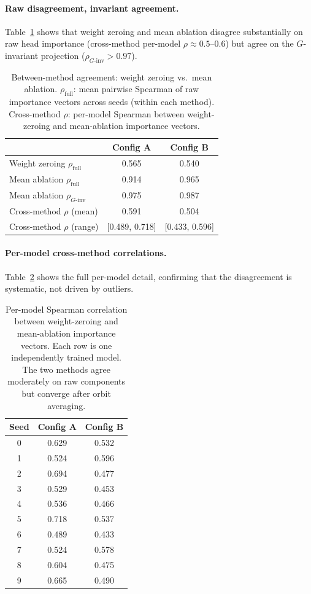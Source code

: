 \documentclass{article}
\begin{document}
\paragraph{Raw disagreement, invariant agreement.}
Table~\ref{tab:mean-ablation-agreement} shows that weight zeroing and mean ablation disagree substantially on raw head importance (cross-method per-model $\rho \approx 0.5$--$0.6$) but agree on the $G$-invariant projection ($\rho_{G\text{-inv}} > 0.97$).

\begin{table}[ht]
\centering
\caption{Between-method agreement: weight zeroing vs.\ mean ablation. $\rho_{\text{full}}$: mean pairwise Spearman of raw importance vectors across seeds (within each method). Cross-method $\rho$: per-model Spearman between weight-zeroing and mean-ablation importance vectors.}
\label{tab:mean-ablation-agreement}
\small
\begin{tabular}{lcc}
\toprule
& \textbf{Config A} & \textbf{Config B} \\
\midrule
Weight zeroing $\rho_{\text{full}}$ & 0.565 & 0.540 \\
Mean ablation $\rho_{\text{full}}$ & 0.914 & 0.965 \\
Mean ablation $\rho_{G\text{-inv}}$ & 0.975 & 0.987 \\
\midrule
Cross-method $\rho$ (mean) & 0.591 & 0.504 \\
Cross-method $\rho$ (range) & [0.489, 0.718] & [0.433, 0.596] \\
\bottomrule
\end{tabular}
\end{table}

\paragraph{Per-model cross-method correlations.}
Table~\ref{tab:cross-method-per-model} shows the full per-model detail, confirming that the disagreement is systematic, not driven by outliers.

\begin{table}[ht]
\centering
\caption{Per-model Spearman correlation between weight-zeroing and mean-ablation importance vectors. Each row is one independently trained model. The two methods agree moderately on raw components but converge after orbit averaging.}
\label{tab:cross-method-per-model}
\small
\begin{tabular}{ccc}
\toprule
\textbf{Seed} & \textbf{Config A} & \textbf{Config B} \\
\midrule
0 & 0.629 & 0.532 \\
1 & 0.524 & 0.596 \\
2 & 0.694 & 0.477 \\
3 & 0.529 & 0.453 \\
4 & 0.536 & 0.466 \\
5 & 0.718 & 0.537 \\
6 & 0.489 & 0.433 \\
7 & 0.524 & 0.578 \\
8 & 0.604 & 0.475 \\
9 & 0.665 & 0.490 \\
\bottomrule
\end{tabular}
\end{table}
\end{document}
